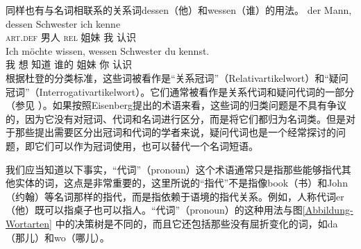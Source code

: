 \pagebreak
同样也有与名词相联系的关系词dessen（他）和wessen（谁）的用法。
\eal
\ex 
\gll der          Mann, dessen Schwester ich kenne\\
     \textsc{art}.\textsc{def} 男人  \textsc{rel} 姐妹 我 认识\\
\ex 
\gll Ich möchte wissen, wessen Schwester du kennst.\\
	 我 想 知道 谁的 姐妹 你 认识\\
\zl
根据杜登的分类标准，这些词被看作是“关系冠词”（Relativartikelwort）和“疑问冠词”（Interrogativartikelwort）。它们通常被看作是关系代词和疑问代词的一部分（参见 ）。如果按照Eisenberg提出的术语来看，这些词的归类问题是不具有争议的，因为它没有对冠词、代词和名词进行区分，而是将它们都归为名词类。但是对于那些提出需要区分出冠词和代词的学者来说，疑问代词也是一个经常探讨的问题，即它们可以作为冠词使用，也可以替代一个名词短语。

我们应当知道以下事实，“代词”（pronoun）这个术语通常只是指那些能够指代其他实体的词，这点是非常重要的，这里所说的“指代”不是指像book（书）和John（约翰）等名词那样的指代，而是指依赖于语境的指代关系。例如，人称代词er（他）既可以指桌子也可以指人。“代词”（pronoun）的这种用法与图\ref{Abbildung-Wortarten}
中的决策树是不同的，而且它还包括那些没有屈折变化的词，如da（那儿）和wo（哪儿）。

